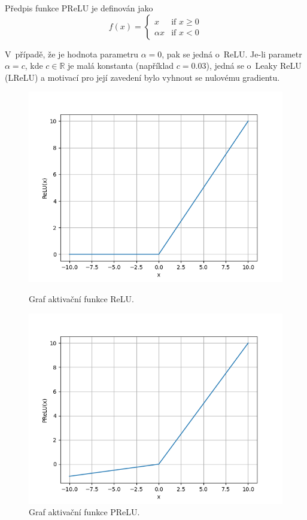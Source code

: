 Předpis funkce PReLU je definován jako
\begin{equation}
  f(x) =
  \begin{cases}
    x & \text{if } x \geq 0 \\
    {\alpha}x & \text{if } x < 0
  \end{cases}
\end{equation}

V~případě, že je hodnota parametru $\alpha=0$, pak se jedná o~ReLU. Je-li parametr $\alpha = c$, kde $c\in\mathbb{R}$ je malá konstanta (například $c = 0.03$), jedná se o~Leaky ReLU (LReLU) a motivací pro její zavedení bylo vyhnout se nulovému gradientu.


\begin{figure}[H]
    \centering
    \begin{minipage}{0.45\textwidth}
        \centering
        \includegraphics[width=1.00\textwidth]{obrazky-figures/relu.png}
        \caption{\label{fig:relu}Graf aktivační funkce ReLU.}
    \end{minipage}\hfill
    \begin{minipage}{0.45\textwidth}
        \centering
        \includegraphics[width=1.00\textwidth]{obrazky-figures/prelu.png}
        \caption{\label{fig:prelu}Graf aktivační funkce PReLU.}
    \end{minipage}
\end{figure}


